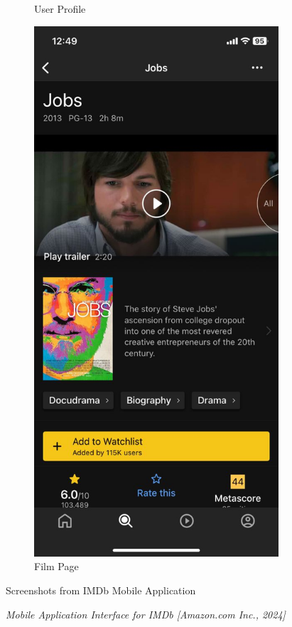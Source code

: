 \begin{figure} [h]
\begin{subfigure}{.3\linewidth}
      \caption{User Profile}
      \label{fig:myfig30}
    \end{subfigure}%
    \hspace{1em}%
    \begin{subfigure}{.3\linewidth}
      \centering
      \includegraphics[width = \linewidth]{mainmatter/images/imdb3.jpg}
      \caption{Film Page}
      \label{fig:myfig31}
    \end{subfigure}
    \caption{Screenshots from IMDb Mobile Application}
    \caption*{\textit{Mobile Application Interface for IMDb [Amazon.com Inc., 2024]}}
\end{figure}
